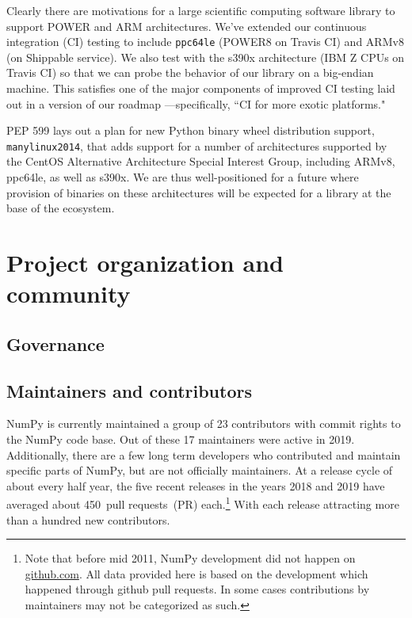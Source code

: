 \documentclass[fleqn,10pt]{wlscirep}
\begin{document}
Clearly there are motivations for a large scientific computing
software library to support POWER and ARM architectures. We've extended
our continuous integration (CI) testing to include \texttt{ppc64le}
(POWER8 on Travis CI) and ARMv8 (on Shippable service). We also test
with the s390x architecture (IBM Z CPUs on Travis CI) so that we
can probe the behavior of our library on a big-endian machine.
This satisfies one of the major components of
improved CI testing laid out in a version of our roadmap
\cite{numpy-roadmap}---specifically, ``CI for more exotic
platforms."

PEP 599\cite{PEP599} lays out a plan for new Python binary wheel
distribution support, \texttt{manylinux2014}, that adds
support for a number of architectures supported by the CentOS
Alternative Architecture Special Interest Group, including
ARMv8, ppc64le, as well as s390x. We are thus well-positioned
for a future where provision of binaries on these architectures
will be expected for a library at the base of the ecosystem.

\section*{Project organization and community}

\subsection*{Governance}


\subsection*{Maintainers and contributors}


NumPy is currently maintained a group of 23 contributors with commit rights
to the NumPy code base. Out of these 17 maintainers were active in 2019.
Additionally, there are a few long term developers who contributed and maintain
specific parts of NumPy, but are not officially maintainers.
At a release cycle of about every half year, the five recent releases in the years
2018 and 2019 have averaged about 450~pull requests~(PR) each.\footnote{
    Note that before mid 2011, NumPy development did not happen on \url{github.com}.
    All data provided here is based on the development which happened through github
    pull requests. In some cases contributions by maintainers may not be categorized as such.}
With each release attracting more than a hundred new contributors.
\end{document}
